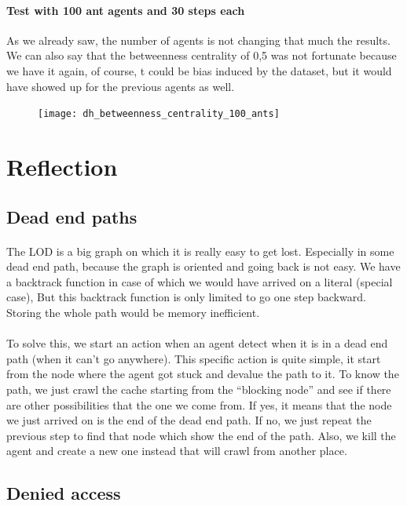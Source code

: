 \documentclass{article}
\begin{document}
		\paragraph{Test with 100 ant agents and 30 steps each}
			As we already saw, the number of agents is not changing that much the results.
			We can also say that the betweenness centrality of 0,5 was not fortunate because we have it again,
			of course, t could be bias induced by the dataset, but it would have showed up for the previous agents as well.
		\begin{figure}[!h]
			\texttt{[image: dh\_betweenness\_centrality\_100\_ants]}
		\end{figure}
		
\section{Reflection}
	\subsection{Dead end paths}
		\paragraph{}
			The LOD is a big graph on which it is really easy to get lost.
			Especially in some dead end path, because the graph is oriented and going back is not easy.
			We have a backtrack function in case of which we would have arrived on a literal (special case),
			But this backtrack function is only limited to go one step backward.
			Storing the whole path would be memory inefficient.
		\paragraph{}
			To solve this, we start an action when an agent detect when it is in a dead end path (when it can't go anywhere).
			This specific action is quite simple, it start from the node where the agent got stuck and devalue the path to it.
			To know the path, we just crawl the cache starting from the “blocking node”
			and see if there are other possibilities that the one we come from.
			If yes, it means that the node we just arrived on is the end of the dead end path.
			If no, we just repeat the previous step to find that node which show the end of the path.
			Also, we kill the agent and create a new one instead that will crawl from another place.
	\subsection{Denied access}
\end{document}
